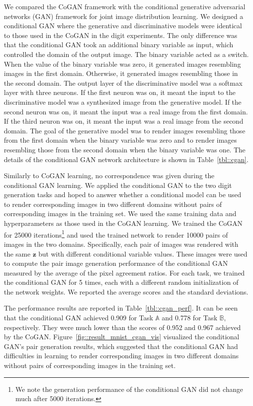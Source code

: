 We compared the CoGAN framework with the conditional generative adversarial networks (GAN) framework for joint image distribution learning. We designed a conditional GAN where the generative and discriminative models were identical to those used in the CoGAN in the digit experiments. The only difference was that the conditional GAN took an additional binary variable as input, which controlled the domain of the output image. The binary variable acted as a switch. When the value of the binary variable was zero, it generated images resembling images in the first domain. Otherwise, it generated images resembling those in the second domain. The output layer of the discriminative model was a softmax layer with three neurons. If the first neuron was on, it meant the input to the discriminative model was a synthesized image from the generative model. If the second neuron was on, it meant the input was a real image from the first domain. If the third neuron was on, it meant the input was a real image from the second domain. The goal of the generative model was to render images resembling those from the first domain when the binary variable was zero and to render images resembling those from the second domain when the binary variable was one. The details of the conditional GAN network architecture is shown in Table~\ref{tbl::cgan}.

Similarly to CoGAN learning, no correspondence was given during the conditional GAN learning. We applied the conditional GAN to the two digit generation tasks and hoped to answer whether a conditional model can be used to render corresponding images in two different domains without pairs of corresponding images in the training set. We used the same training data and hyperparameters as those used in the CoGAN learning. We trained the CoGAN for 25000 iterations\footnote{
We note the generation performance of the conditional GAN did not change much after 5000 iterations.} and used the trained network to render 10000 pairs of images in the two domains. Specifically, each pair of images was rendered with the same $\mathbf{z}$ but with different conditional variable values. These images were used to compute the pair image generation performance of the conditional GAN measured by the average of the pixel agreement ratios. For each task, we trained the conditional GAN for 5 times, each with a different random initialization of the network weights. We reported the average scores and the standard deviations.

The performance results are reported in Table~\ref{tbl::cgan_perf}. It can be seen that the conditional GAN achieved 0.909 for Task $\mathbb{A}$ and 0.778 for Task $\mathbb{B}$, respectively. They were much lower than the scores of 0.952 and 0.967 achieved by the CoGAN. Figure~\ref{fig::result_mnist_cgan_vis} visualized the conditional GAN's pair generation results, which suggested that the conditional GAN had difficulties in learning to render corresponding images in two different domains without pairs of corresponding images in the training set. 




\clearpage